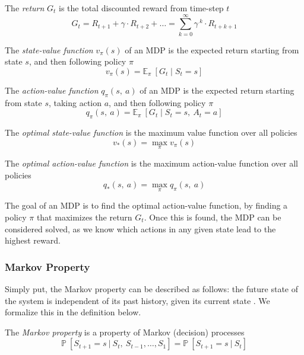 \begin{definition}
  The \textit{return} $G_{t}$ is the total discounted reward from time-step $t$
  $$G_{t}=R_{t+1}+\gamma\cdot R_{t+2}+\ldots=\sum_{k=0}^{\infty}\gamma^{~k}\cdot R_{t+k+1}$$
\end{definition}

\begin{definition} \label{def:state_value_function}
  The \textit{state-value function} $v_\pi(s)$ of an MDP is the expected return starting from state $s$, and then following policy $\pi$
  $$v_\pi(s)=\mathbb{E}_{\pi}~[G_{t}\mid S_{t}= s]$$
\end{definition}

\begin{definition} \label{def:action_value_function}
  The \textit{action-value function} $q_\pi(s,~a)$ of an MDP is the expected return starting from state $s$, taking action $a$, and then following policy $\pi$
  $$q_\pi(s,~a)=\mathbb{E}_{\pi}~[G_{t}\mid S_{t}= s,~A_{t}= a]$$
\end{definition}

\begin{definition}
  The \textit{optimal state-value function} is the maximum value function over all policies
  $$v_*(s)=\max_\pi v_\pi(s)$$
\end{definition}

\begin{definition}
  The \textit{optimal action-value function} is the maximum action-value function over all policies
  $$q_*(s,~a)=\max_\pi q_\pi(s,~a)$$
\end{definition}

The goal of an MDP is to find the optimal action-value function, by finding a
policy $\pi$ that maximizes the return $G_{t}$. Once this is found, the MDP can
be considered solved, as we know which actions in any given state lead to the
highest reward.

\subsubsection{Markov Property} \label{sec:markov_property}

Simply put, the Markov property can be described as follows: the future state
of the system is independent of its past history, given its current state
\cite{markov1954theory}. We formalize this in the definition below.

\begin{definition}
  The \textit{Markov property} is a property of Markov (decision) processes
  $$\mathbb{P}~[S_{t+1}=s~|~S_t,~S_{t-1},\ldots, S_1] = \mathbb{P}~[S_{t+1}=s~|~S_t]$$
\end{definition}

